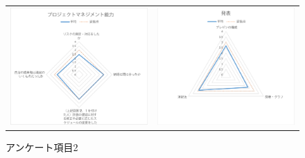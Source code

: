 \documentclass[uplatex]{jsarticle}
\begin{document}
\begin{center}
  \begin{figure}[H]
    \begin{tabular}{cc}
      \begin{minipage}[t]{0.45\hsize}
        \centering
        \includegraphics[keepaspectratio, scale=0.4]{g1.pdf}
        \caption{アンケート項目1}
        \label{ラベル1}
      \end{minipage} &
      \begin{minipage}[t]{0.60\hsize}
        \centering
        \includegraphics[keepaspectratio, scale=0.4]{g2.pdf}
        \caption{アンケート項目2}
        \label{ラベル2}
      \end{minipage}
    \end{tabular}
  \end{figure}
\end{center}
\end{document}
